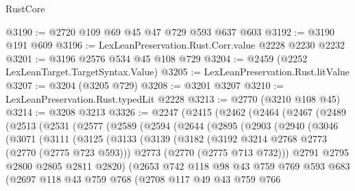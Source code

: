 \begin{lexlean}{RustCore}
\begin{coremodule}
@3190 := @2720 @109 @69 @45 @47 @729 @593 @637 @603
@3192 := @3190 @191 @609
@3196 := LexLeanPreservation.Rust.Corr.value @2228 @2230 @2232
@3201 := @3196 @2576 @534 @45 @108 @729
@3204 := @2459 (@2252 LexLeanTarget.TargetSyntax.Value)
@3205 := LexLeanPreservation.Rust.litValue
@3207 := @3204 (@3205 @729)
@3208 := @3201 @3207
@3210 := LexLeanPreservation.Rust.typedLit @2228
@3213 := @2770 (@3210 @108 @45)
@3214 := @3208 @3213
@3326 := @2247
    (@2415
      (@2462
        (@2464
          (@2467
            (@2489
              (@2513
                (@2531
                  (@2577
                    (@2589
                      (@2594
                        (@2644
                          (@2895
                            (@2903
                              (@2940
                                (@3046
                                  (@3071
                                    (@3111
                                      (@3125
                                        (@3133
                                          (@3139
                                            (@3182
                                              (@3192 @3214 @2768 @2773 (@2770 (@2775 @723 @593)))
                                              @2773
                                              (@2770 (@2775 @713 @732)))
                                            @2791
                                            @2795
                                            @2800
                                            @2805
                                            @2811
                                            @2820)
                                          (@2653
                                            @742
                                            @118
                                            @98
                                            @43
                                            @759
                                            @769
                                            @593
                                            @683
                                            (@2697
                                              @118
                                              @43
                                              @759
                                              @768
                                              (@2708
                                                @117
                                                @49
                                                @43
                                                @759
                                                @766

\end{coremodule}
\end{lexlean}
